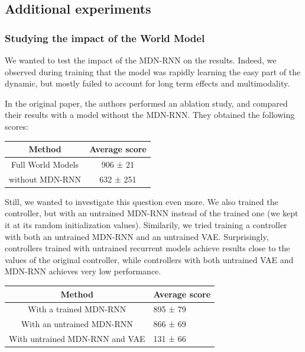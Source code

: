 \documentclass[10pt,a4paper,onecolumn]{article}
\begin{document}
\hypertarget{additional-experiments}{%
\subsection{Additional experiments}\label{additional-experiments}}

\hypertarget{studying-the-impact-of-the-world-model}{%
\subsubsection{Studying the impact of the World
Model}\label{studying-the-impact-of-the-world-model}}

We wanted to test the impact of the MDN-RNN on the results. Indeed, we
observed during training that the model was rapidly learning the easy
part of the dynamic, but mostly failed to account for long term effects
and multimodality.

In the original paper, the authors performed an ablation study, and
compared their results with a model without the MDN-RNN. They obtained
the following scores:

\begin{longtable}[]{@{}cc@{}}
\toprule
Method & Average score\tabularnewline
\midrule
\endhead
Full World Models \textcite{NIPS2018_7512} & 906 ± 21\tabularnewline
without MDN-RNN \textcite{NIPS2018_7512} & 632 ± 251\tabularnewline
\bottomrule
\end{longtable}

Still, we wanted to investigate this question even more. We also trained
the controller, but with an untrained MDN-RNN instead of the trained one
(we kept it at its random initialization values). Similarily, we tried
training a controller with both an untrained MDN-RNN and an untrained
VAE. Surprisingly, controllers trained with untrained recurrent models
achieve results close to the values of the original controller, while
controllers with both untrained VAE and MDN-RNN achieves very low
performance.

\begin{longtable}[]{@{}cl@{}}
\toprule
Method & Average score\tabularnewline
\midrule
\endhead
With a trained MDN-RNN & 895 ± 79\tabularnewline
With an untrained MDN-RNN & 866 ± 69\tabularnewline
With untrained MDN-RNN and VAE & 131 ± 66\tabularnewline
\bottomrule
\end{longtable}
\end{document}
